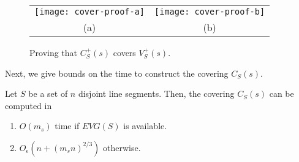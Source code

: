\documentclass{patmorin}
\newcommand{\EVG}{\mathit{EVG}}
\newcommand{\Oe}{O_\epsilon}
\begin{document}
\begin{figure}
  \begin{center}
    \begin{tabular}{cc}
      \texttt{[image: cover-proof-a]} &
      \texttt{[image: cover-proof-b]} \\
      (a) & (b)
    \end{tabular}
  \end{center}
  \caption{Proving that $C^+_S(s)$ covers $V^+_S(s)$.}
\end{figure}

Next, we give bounds on the time to construct the covering $C_S(s)$.

\begin{lem}
  Let $S$ be a set of $n$ disjoint line segments.  Then, the covering
  $C_S(s)$ can be computed in
  \begin{enumerate}
    \item $O(m_s)$ time if $\EVG(S)$ is available.
    \item $\Oe(n+(m_s n)^{2/3})$ otherwise.
  \end{enumerate}
\end{lem}
\end{document}
